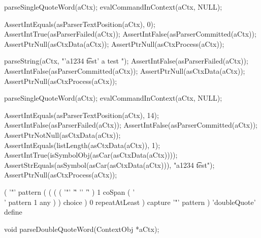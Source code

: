   parseSingleQuoteWord(aCtx);
  evalCommandInContext(aCtx, NULL);
  
  AssertIntEquals(asParserTextPosition(aCtx), 0);
  AssertIntTrue(asParserFailed(aCtx));
  AssertIntFalse(asParserCommitted(aCtx));
  AssertPtrNull(asCtxData(aCtx));
  AssertPtrNull(asCtxProcess(aCtx));
\stopCTest
\stopTestCase

\startCTest
  parseString(aCtx, "'a1234 \t test' a test ");
  AssertIntFalse(asParserFailed(aCtx));
  AssertIntFalse(asParserCommitted(aCtx));
  AssertPtrNull(asCtxData(aCtx));
  AssertPtrNull(asCtxProcess(aCtx));
  
  parseSingleQuoteWord(aCtx);
  evalCommandInContext(aCtx, NULL);
  
  AssertIntEquals(asParserTextPosition(aCtx), 14);
  AssertIntFalse(asParserFailed(aCtx));
  AssertIntFalse(asParserCommitted(aCtx));
  AssertPtrNotNull(asCtxData(aCtx));
  AssertIntEquals(listLength(asCtxData(aCtx)), 1);
  AssertIntTrue(isSymbolObj(asCar(asCtxData(aCtx))));
  AssertStrEquals(asSymbol(asCar(asCtxData(aCtx))), "a1234 \t test");
  AssertPtrNull(asCtxProcess(aCtx));
\stopCTest
\stopTestCase
\stopTestSuite

\startTestSuite[parseDoubleQuoteWord]

\starttyping
(
  '"' pattern
  (
    ( 
      (
        ( '"' '\r' '\n' '\f' ) 1 coSpan
        ( '\\' pattern 1 any )
      ) choice
    ) 0 repeatAtLeast
  ) capture
  '"' pattern
) 'doubleQuote' define
\stoptyping

\startCHeader
void parseDoubleQuoteWord(ContextObj *aCtx);
\stopCHeader

